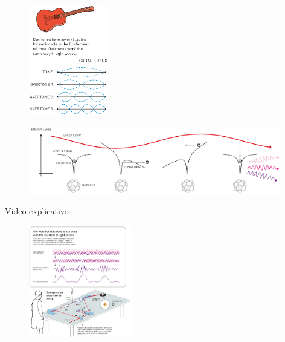 \documentclass[12pt,brazil]{beamer}
\begin{document}
\begin{frame}

  \begin{multicols}{2}
    \begin{minipage}[b][20ex][t]{\linewidth}
    \vspace*{0.5cm}
      \begin{figure}
        \includegraphics[width=3.5cm]{figuras/fig_n03}
      \end{figure}    
    \end{minipage}

    \begin{minipage}[b][20ex][t]{\linewidth}
    \vspace*{1cm}
      \begin{figure}
        \hspace*{0.5cm}\includegraphics[width=11cm]{figuras/fig_n04}
      \end{figure}
    \vspace*{-0.5cm}
      \fontsize{5pt}{11pt}\selectfont
      \href{https://youtu.be/Xvb6vysV5Pg?t=239}{\color{blue} Video explicativo}
    \end{minipage}

    \begin{minipage}[b][40ex][t]{\linewidth}
    \vspace*{0.50cm}
      \begin{figure}
        \includegraphics[width=4.5cm]{figuras/fig_n05}
      \end{figure}
    \end{minipage}
  \end{multicols}
\end{frame}
\end{document}
